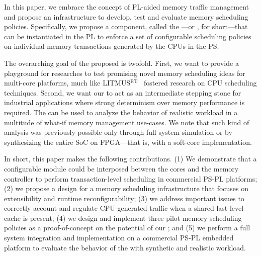 In this paper, we embrace the concept of PL-aided memory traffic
management and propose an infrastructure to develop, test and evaluate
memory scheduling policies. Specifically, we propose a component,
called the \schimL---or \schim, for short---that can be instantiated
in the PL to enforce a set of configurable scheduling policies on
individual memory transactions generated by the CPUs in the PS.

The overarching goal of the proposed \schim is twofold. First, we want
to provide a playground for researches to test promising novel memory
scheduling ideas for multi-core platforms, much like
LITMUS$^{\text{RT}}$~\cite{litmus-rt} fostered research on CPU
scheduling techniques. Second, we want our \schim to act as an
intermediate stepping stone for industrial applications where strong
determinism over memory performance is required. The \schim can be
used to analyze the behavior of realistic workload in a multitude of
what-if memory management use-cases. We note that such kind of
analysis was previously possible only through full-system simulation
or by synthesizing the entire SoC on FPGA---that is, with a soft-core
implementation.

In short, this paper makes the following contributions. (1) We
demonstrate that a configurable module could be interposed between the
cores and the memory controller to perform transaction-level
scheduling in commercial PS-PL platforms; (2) we propose a design for
a memory scheduling infrastructure that focuses on extensibility and
runtime reconfigurability; (3) we address important issues to
correctly account and regulate CPU-generated traffic when a shared
last-level cache is present; (4) we design and implement three pilot
memory scheduling policies as a proof-of-concept on the potential of
our \schim; and (5) we perform a full system integration and
implementation on a commercial PS-PL embedded platform to evaluate the behavior of the \schim with synthetic and realistic workload.






